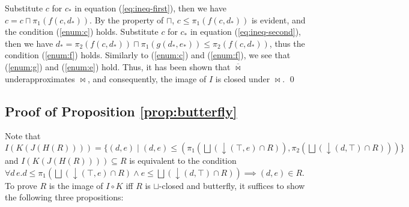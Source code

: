 \documentclass{llncs}
\newcommand{\join}{\sqcup}
\newcommand{\bigjoin}{\bigsqcup}
\newcommand{\meet}{\sqcap}
\newcommand{\comp}{\circ}
\newcommand{\bowtielift}{\mathbin{\overline{\bowtie}}}
\begin{document}
Substitute $c$ for $c_{*}$ in equation (\ref{eq:ineq-first}), then we have $c = c \meet \pi_{1}( f (c , d_{*}))$. By the property of $\meet$, $c \leq \pi_{1}( f (c , d_{*}))$ is evident, and the condition (\ref{enum:c}) holds.
Substitute $c$ for $c_{*}$ in equation (\ref{eq:ineq-second}), then we have $d_{*} = \pi_{2}(f (c , d_{*})) \meet \pi_{1}(g (d_{*} , e_{*})) \leq \pi_{2}(f (c , d_{*}))$, thus the condition (\ref{enum:f}) holds.
Similarly to (\ref{enum:c}) and (\ref{enum:f}), we see that (\ref{enum:g}) and (\ref{enum:e}) hold.
Thus, it has been shown that $\bowtielift$ underapproximates $\bowtie$, and consequently, the image of $I$ is closed under $\bowtie$. \qed

\subsection{Proof of Proposition \ref{prop:butterfly}}
Note that $I(K(J(H(R)))) = \{ (d , e) \mid (d , e) \leq (\pi_{1} (\bigjoin(\downarrow (\top , e) \cap R)) , \pi_{2}(\bigjoin(\downarrow (d , \top) \cap R))) \}$ and
$I(K(J(H(R)))) \subseteq R$ is equivalent to the condition $\forall d\, e. d \leq \pi_{1} (\bigjoin(\downarrow (\top , e) \cap R) \land e \leq \bigjoin(\downarrow (d , \top) \cap R)) \implies (d , e) \in R$.
To prove $R$ is the image of $I \comp K$ iff $R$ is $\join$-closed and butterfly, it suffices to show the following three propositions:
\end{document}
